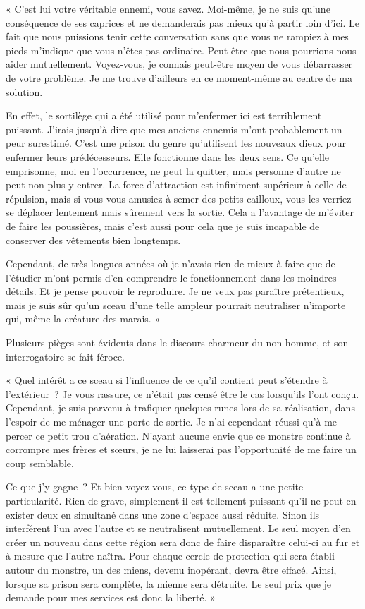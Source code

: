 \documentclass{report}
\begin{document}
« C'est lui votre véritable ennemi, vous savez. Moi-même, je ne suis qu'une conséquence de ses caprices et ne demanderais pas mieux qu'à partir loin d'ici. Le fait que nous puissions tenir cette conversation sans que vous ne rampiez à mes pieds m'indique que vous n'êtes pas ordinaire. Peut-être que nous pourrions nous aider mutuellement. Voyez-vous, je connais peut-être moyen de vous débarrasser de votre problème. Je me trouve d'ailleurs en ce moment-même au centre de ma solution.

En effet, le sortilège qui a été utilisé pour m'enfermer ici est terriblement puissant. J'irais jusqu'à dire que mes anciens ennemis m'ont probablement un peur surestimé. C'est une prison du genre qu'utilisent les nouveaux dieux pour enfermer leurs prédécesseurs. Elle fonctionne dans les deux sens. Ce qu'elle emprisonne, moi en l’occurrence, ne peut la quitter, mais personne d'autre ne peut non plus y entrer. La force d'attraction est infiniment supérieur à celle de répulsion, mais si vous vous amusiez à semer des petits cailloux, vous les verriez se déplacer lentement mais sûrement vers la sortie. Cela a l'avantage de m'éviter de faire les poussières, mais c'est aussi pour cela que je suis incapable de conserver des vêtements bien longtemps.

Cependant, de très longues années où je n'avais rien de mieux à faire que de l'étudier m'ont permis d'en comprendre le fonctionnement dans les moindres détails. Et je pense pouvoir le reproduire. Je ne veux pas paraître prétentieux, mais je suis sûr qu'un sceau d'une telle ampleur pourrait neutraliser n'importe qui, même la créature des marais. »

Plusieurs pièges sont évidents dans le discours charmeur du non-homme, et son interrogatoire se fait féroce.

« Quel intérêt a ce sceau si l'influence de ce qu'il contient peut s'étendre à l'extérieur ? Je vous rassure, ce n'était pas censé être le cas lorsqu'ils l'ont conçu. Cependant, je suis parvenu à trafiquer quelques runes lors de sa réalisation, dans l'espoir de me ménager une porte de sortie. Je n'ai cependant réussi qu'à me percer ce petit trou d'aération. N'ayant aucune envie que ce monstre continue à corrompre mes frères et sœurs, je ne lui laisserai pas l'opportunité de me faire un coup semblable.

Ce que j'y gagne ? Et bien voyez-vous, ce type de sceau a une petite particularité. Rien de grave, simplement il est tellement puissant qu'il ne peut en exister deux en simultané dans une zone d'espace aussi réduite. Sinon ils interférent l'un avec l'autre et se neutralisent mutuellement. Le seul moyen d'en créer un nouveau dans cette région sera donc de faire disparaître celui-ci au fur et à mesure que l'autre naîtra. Pour chaque cercle de protection qui sera établi autour du monstre, un des miens, devenu inopérant, devra être effacé. Ainsi, lorsque sa prison sera complète, la mienne sera détruite. Le seul prix que je demande pour mes services est donc la liberté. »
\end{document}
